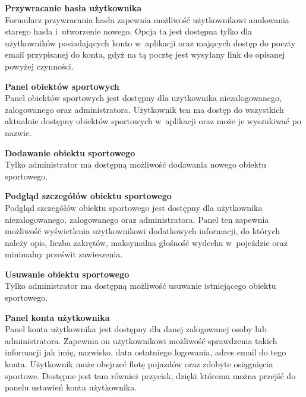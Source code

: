 \documentclass[../Kamil_Kowalewski_Main.tex]{subfiles}
\begin{document}
{{{            \noindent\textbf{Przywracanie hasła użytkownika}\\
            \indent Formularz przywracania hasła zapewnia możliwość użytkownikowi
            anulowania starego hasła i~utworzenie nowego. Opcja ta jest dostępna
            tylko dla użytkowników posiadających konto w~aplikacji oraz mających
            dostęp do poczty email przypisanej do konta, gdyż na tą pocztę jest
            wysyłany link do opisanej powyżej czynności.

            \noindent\textbf{Panel obiektów sportowych}\\
            \indent Panel obiektów sportowych jest dostępny dla użytkownika
            niezalogowanego, zalogowanego oraz administratora. Użytkownik ten ma dostęp
            do wszystkich aktualnie dostępny obiektów sportowych w~aplikacji oraz może
            je wyszukiwać po nazwie.

            \noindent\textbf{Dodawanie obiektu sportowego}\\
            \indent Tylko administrator ma dostępną możliwość dodawania nowego
            obiektu sportowego.

            \noindent\textbf{Podgląd szczegółów obiektu sportowego}\\
            \indent Podgląd szczegółów obiektu sportowego jest dostępny dla użytkownika
            niezalogowanego, zalogowanego oraz administratora. Panel ten zapewnia
            możliwość wyświetlenia użytkownikowi dodatkowych informacji, do których
            należy opis, liczba zakrętów, maksymalna głośność wydechu w~pojeździe oraz
            minimalny prześwit zawieszenia.

            \noindent\textbf{Usuwanie obiektu sportowego}\\
            \indent Tylko administrator ma dostępną możliwość usuwanie istniejącego
            obiektu sportowego.

            \noindent\textbf{Panel konta użytkownika}\\
            \indent Panel konta użytkownika jest dostępny dla danej zalogowanej osoby
            lub administratora. Zapewnia on użytkownikowi możliwość sprawdzenia takich
            informacji jak imię, nazwisko, data ostatniego logowania, adres email do
            tego konta. Użytkownik może obejrzeć flotę pojazdów oraz zdobyte
            osiągnięcia sportowe. Dostępne jest tam również przycisk, dzięki
            któremu można przejść do panelu ustawień konta użytkownika.

}}}
\end{document}

